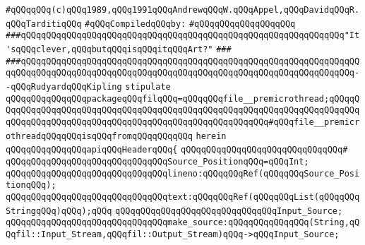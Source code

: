 \label{src/app/yacc/src/header.api}
\verb|#qQQqqQQq(c)qQQq1989,qQQq1991qQQqAndrewqQQqW.qQQqAppel,qQQqDavidqQQqR.qQQqTarditiqQQq|\newline
\newline
\verb|#qQQqCompiledqQQqby:|\newline
\verb|#qQQqqQQqqQQqqQQqqQQq|\newline
\newline
\newline
\newline
\verb|###qQQqqQQqqQQqqQQqqQQqqQQqqQQqqQQqqQQqqQQqqQQqqQQqqQQqqQQqqQQqqQQq"It'sqQQqclever,qQQqbutqQQqisqQQqitqQQqArt?"|\newline
\verb|###|\newline
\verb|###qQQqqQQqqQQqqQQqqQQqqQQqqQQqqQQqqQQqqQQqqQQqqQQqqQQqqQQqqQQqqQQqqQQqqQQqqQQqqQQqqQQqqQQqqQQqqQQqqQQqqQQqqQQqqQQqqQQqqQQqqQQqqQQqqQQqqQQq--qQQqRudyardqQQqKipling|\newline
\newline
\newline
\verb|stipulate|\newline
\verb|qQQqqQQqqQQqqQQqpackageqQQqfilqQQq=qQQqqQQqfile__premicrothread;qQQqqQQqqQQqqQQqqQQqqQQqqQQqqQQqqQQqqQQqqQQqqQQqqQQqqQQqqQQqqQQqqQQqqQQqqQQqqQQqqQQqqQQqqQQqqQQqqQQqqQQqqQQqqQQqqQQqqQQqqQQqqQQq#qQQqfile__premicrothreadqQQqqQQqisqQQqfromqQQqqQQqqQQq|\newline
\verb|herein|\newline
\newline
\verb|qQQqqQQqqQQqqQQqapiqQQqHeaderqQQq{|\newline
\verb|qQQqqQQqqQQqqQQqqQQqqQQqqQQqqQQq#|\newline
\verb|qQQqqQQqqQQqqQQqqQQqqQQqqQQqqQQqSource_PositionqQQq=qQQqInt;|\newline
\verb|qQQqqQQqqQQqqQQqqQQqqQQqqQQqqQQqlineno:qQQqqQQqRef(qQQqqQQqSource_PositionqQQq);|\newline
\verb|qQQqqQQqqQQqqQQqqQQqqQQqqQQqqQQqtext:qQQqqQQqRef(qQQqqQQqList(qQQqqQQqStringqQQq)qQQq);qQQq|\newline
\newline
\verb|qQQqqQQqqQQqqQQqqQQqqQQqqQQqqQQqInput_Source;|\newline
\newline
\verb|qQQqqQQqqQQqqQQqqQQqqQQqqQQqqQQqmake_source:qQQqqQQqqQQqqQQq(String,qQQqfil::Input_Stream,qQQqfil::Output_Stream)qQQq->qQQqInput_Source;|\newline
